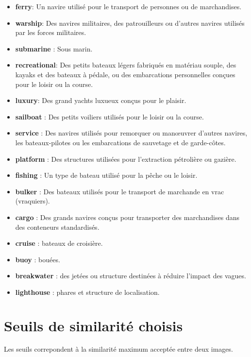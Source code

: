 \begin{itemize}
    \item \textbf{ferry}: Un navire utilisé pour le transport de personnes ou de marchandises. 
    \item \textbf{warship}: Des navires militaires, des patrouilleurs ou d'autres navires utilisés par les forces militaires. 
    \item \textbf{submarine} : Sous marin. 
    \item \textbf{recreational}: Des petits bateaux légers fabriqués en matériau souple, des kayaks et des bateaux à pédale, ou des embarcations personnelles conçues pour le loisir ou la course. 
    \item \textbf{luxury}: Des grand yachts luxueux conçus pour le plaisir. 
    \item \textbf{sailboat} : Des petits voiliers utilisés pour le loisir ou la course. 
    \item \textbf{service} : Des navires utilisés pour remorquer ou manœuvrer d'autres navires, les bateaux-pilotes ou les embarcations de sauvetage et de garde-côtes. 
    \item \textbf{platform} : Des structures utilisées pour l'extraction pétrolière ou gazière. 
    \item \textbf{fishing} : Un type de bateau utilisé pour la pêche ou le loisir. 
    \item \textbf{bulker} : Des bateaux utilisés pour le transport de marchande en vrac (vraquiers). 
    \item \textbf{cargo} : Des grands navires conçus pour transporter des marchandises dans des conteneurs standardisés. 
    \item \textbf{cruise} : bateaux de croisière.  
    \item \textbf{buoy} : bouées.
    \item \textbf{breakwater} : des jetées ou structure destinées à réduire l'impact des vagues.
    \item \textbf{lighthouse} : phares et structure de localisation.
\end{itemize}
\label{classes_annotations}

\pagebreak


\chapter{Seuils de similarité choisis}

Les seuils correpondent à la similarité maximum acceptée entre deux images.

